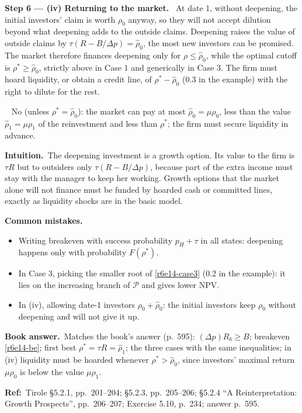 \documentclass[11pt,a4paper]{article}
\newcommand{\step}[2]{\par\medskip\noindent\textbf{Step #1 --- #2.}~}
\newcommand{\intuition}{\par\medskip\noindent\textbf{Intuition.}~}
\newcommand{\bookans}{\par\medskip\noindent\textbf{Book answer.}~}
\newcommand{\refbib}{\par\smallskip\noindent\textbf{Ref:}~}
\newcommand{\answer}[1]{\par\smallskip\noindent\fbox{\textbf{Answer #1.}}~}
\newcommand{\pitfalls}{\par\medskip\noindent\textbf{Common mistakes.}}
\begin{document}
\step{6}{(iv) Returning to the market} At date 1, without deepening, the initial investors' claim is worth $\rho_0$ anyway, so they will not accept dilution beyond what deepening adds to the outside claims. Deepening raises the value of outside claims by $\tau(R-B/\Delta p)=\hat\rho_0$, the most new investors can be promised. The market therefore finances deepening only for $\rho\le\hat\rho_0$, while the optimal cutoff is $\rho^*\ge\hat\rho_0$, strictly above in Case 1 and generically in Case 3. The firm must hoard liquidity, or obtain a credit line, of $\rho^*-\hat\rho_0$ (0.3 in the example) with the right to dilute for the rest.
\answer{(iv)} No (unless $\rho^*=\hat\rho_0$): the market can pay at most $\hat\rho_0=\mu\rho_0$, less than the value $\hat\rho_1=\mu\rho_1$ of the reinvestment and less than $\rho^*$; the firm must secure liquidity in advance.

\intuition The deepening investment is a growth option. Its value to the firm is $\tau R$ but to outsiders only $\tau(R-B/\Delta p)$, because part of the extra income must stay with the manager to keep her working. Growth options that the market alone will not finance must be funded by hoarded cash or committed lines, exactly as liquidity shocks are in the basic model.

\pitfalls
\begin{itemize}
  \item Writing breakeven with success probability $p_H+\tau$ in all states: deepening happens only with probability $F(\rho^*)$.
  \item In Case 3, picking the smaller root of \eqref{r6e14-case3} (0.2 in the example): it lies on the increasing branch of $\mathcal P$ and gives lower NPV.
  \item In (iv), allowing date-1 investors $\rho_0+\hat\rho_0$: the initial investors keep $\rho_0$ without deepening and will not give it up.
\end{itemize}

\bookans Matches the book's answer (p.~595): $(\Delta p)R_b\ge B$; breakeven \eqref{r6e14-be}; first best $\rho^*=\tau R=\hat\rho_1$; the three cases with the same inequalities; in (iv) liquidity must be hoarded whenever $\rho^*>\hat\rho_0$, since investors' maximal return $\mu\rho_0$ is below the value $\mu\rho_1$.

\refbib Tirole \S 5.2.1, pp.~201--204; \S 5.2.3, pp.~205--206; \S 5.2.4 ``A Reinterpretation: Growth Prospects'', pp.~206--207; Exercise 5.10, p.~234; answer p.~595.
\end{document}
